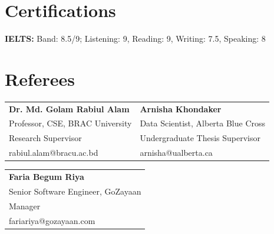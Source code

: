 \documentclass[]{resume-openfont}
\begin{document}
\section{Certifications}
\sectionsep
\begin{bullets}
    \item \textbf{IELTS:} Band: 8.5/9; Listening: 9, Reading: 9, Writing: 7.5, Speaking: 8
\end{bullets}
\sectionsep

\section{Referees}
\sectionsep

\begin{tabular}{p{}p{}}
\textbf{Dr. Md. Golam Rabiul Alam} & \textbf{Arnisha Khondaker} \\
Professor, CSE, BRAC University & Data Scientist, Alberta Blue Cross \\
Research Supervisor & Undergraduate Thesis Supervisor \\
rabiul.alam@bracu.ac.bd & arnisha@ualberta.ca \\
\end{tabular}

\vspace{6pt}
\begin{tabular}{p{}}
\textbf{Faria Begum Riya} \\
Senior Software Engineer, GoZayaan \\
Manager \\
fariariya@gozayaan.com \\
\end{tabular}
\end{document}
